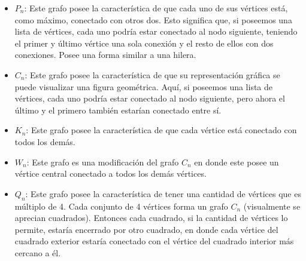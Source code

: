 \documentclass[spanish, fleqn]{article}
\begin{document}
\begin{enumerate}
\begin{itemize}
\item $P_{n}$: Este grafo posee la característica de que cada uno de sus vértices está, como máximo, conectado con otros dos. Esto significa que, si poseemos una lista de vértices, cada uno podría estar conectado al nodo siguiente, teniendo el primer y último vértice una sola conexión y el resto de ellos con dos conexiones. Posee una forma similar a una hilera.
\item $C_{n}$: Este grafo posee la característica de que su representación gráfica se puede visualizar una figura geométrica. Aquí, si poseemos una lista de vértices, cada uno podría estar conectado al nodo siguiente, pero ahora el último y el primero también estarían conectado entre sí. 
\item $K_{n}$: Este grafo posee la característica de que cada vértice está conectado con todos los demás.
\item $W_{n}$: Este grafo es una modificación del grafo $C_{n}$ en donde este posee un vértice central conectado a todos los demás vértices. 
\item $Q_{n}$: Este grafo posee la característica de tener una cantidad de vértices que es múltiplo de 4. Cada conjunto de 4 vértices forma un grafo $C_{n}$ (visualmente se aprecian cuadrados). Entonces cada cuadrado, si la cantidad de vértices lo permite, estaría encerrado por otro cuadrado, en donde cada vértice del cuadrado exterior estaría conectado con el vértice del cuadrado interior más cercano a él.
\end{itemize}  
\end{enumerate}
\end{document}
